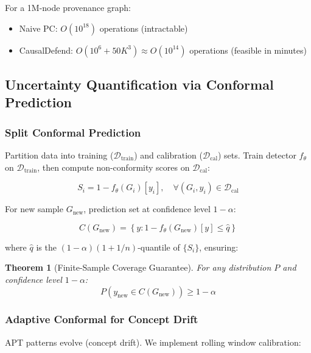 \documentclass[conference]{IEEEtran}
\newtheorem{theorem}{Theorem}
\begin{document}
For a 1M-node provenance graph:
\begin{itemize}
    \item Naive PC: $O(10^{18})$ operations (intractable)
    \item CausalDefend: $O(10^6 + 50K^3) \approx O(10^{14})$ operations (feasible in minutes)
\end{itemize}

\subsection{Uncertainty Quantification via Conformal Prediction}

\subsubsection{Split Conformal Prediction}

Partition data into training ($\mathcal{D}_{\text{train}}$) and calibration ($\mathcal{D}_{\text{cal}}$) sets. Train detector $f_\theta$ on $\mathcal{D}_{\text{train}}$, then compute non-conformity scores on $\mathcal{D}_{\text{cal}}$:

\begin{equation}
S_i = 1 - f_\theta(G_i)[y_i], \quad \forall (G_i, y_i) \in \mathcal{D}_{\text{cal}}
\end{equation}

For new sample $G_{\text{new}}$, prediction set at confidence level $1-\alpha$:

\begin{equation}
C(G_{\text{new}}) = \left\{ y : 1 - f_\theta(G_{\text{new}})[y] \leq \hat{q} \right\}
\end{equation}

where $\hat{q}$ is the $(1-\alpha)(1 + 1/n)$-quantile of $\{S_i\}$, ensuring:

\begin{theorem}[Finite-Sample Coverage Guarantee]
For any distribution $P$ and confidence level $1-\alpha$:
\begin{equation}
P\left( y_{\text{new}} \in C(G_{\text{new}}) \right) \geq 1 - \alpha
\end{equation}
\end{theorem}

\subsubsection{Adaptive Conformal for Concept Drift}

APT patterns evolve (concept drift). We implement rolling window calibration:
\end{document}
